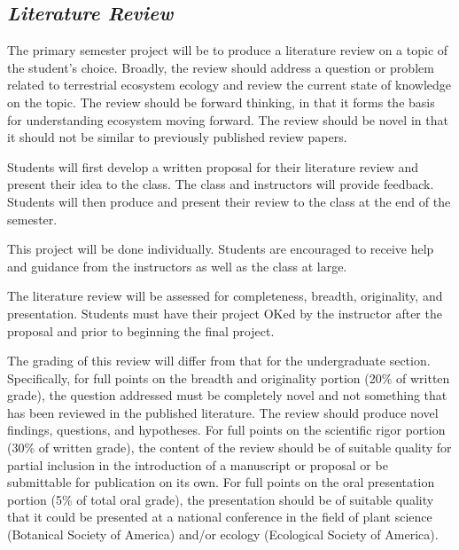 \documentclass[12pt, notitlepage]{article}   	%
\begin{document}
{\subsection{\textit{Literature Review}}
The primary semester project will be to produce a literature review on a topic 
of the student's choice.
Broadly, the review should address a question or problem related 
to terrestrial ecosystem ecology and review the current state of knowledge on the topic.
The review should be forward thinking, in that it forms the
basis for understanding ecosystem moving forward.
The review should be novel in that it should not be similar to previously published
review papers.

Students will first develop a written proposal for their literature review and present 
their idea to the class. The class and instructors will provide feedback. Students will then produce and present 
their review to the class at the end of the semester. 

This project will be done individually. Students are encouraged to receive help and guidance 
from the instructors as well as the class at large. 

The literature review will be assessed for completeness, breadth, originality, and presentation.
Students must have their project OKed by the instructor after the proposal and prior to
beginning the final project.

The grading of this review will differ from that for the undergraduate section. Specifically,
for full points on the breadth and originality portion (20\% of written grade), the question addressed must be completely novel and
not something that has been reviewed in the published literature. The review
should produce novel findings, questions, and hypotheses. For full points on the scientific rigor portion (30\% of written grade),
the content of the review should be of suitable quality for partial inclusion
in the introduction of a manuscript or proposal or be submittable for
publication on its own. For full points on the oral presentation portion (5\% of total oral grade), 
the presentation should be of suitable quality that it could be presented
at a national conference in the field of plant science (Botanical Society of America) and/or ecology
(Ecological Society of America).

\newpage

}
\end{document}
